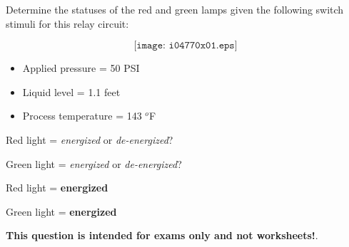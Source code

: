 

Determine the statuses of the red and green lamps given the following switch stimuli for this relay circuit:

$$\texttt{[image: i04770x01.eps]}$$

\begin{itemize}
\item{} Applied pressure = 50 PSI
\item{} Liquid level = 1.1 feet
\item{} Process temperature = 143 $^{o}$F
\end{itemize}

\vskip 10pt

Red light = {\it energized} or {\it de-energized}?

\vskip 10pt

Green light = {\it energized} or {\it de-energized}?







Red light = {\bf energized}

Green light = {\bf energized}







{\bf This question is intended for exams only and not worksheets!}.


